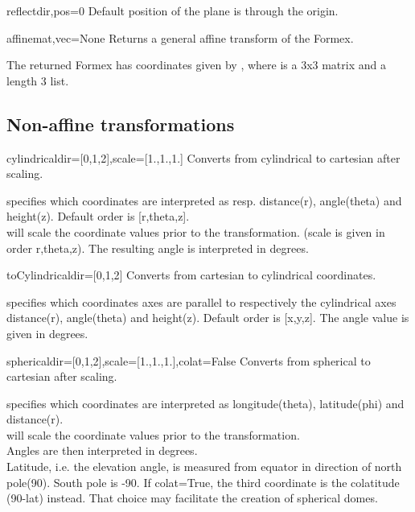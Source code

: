 {{\begin{methoddesc}{reflect}{dir,pos=0}
Default position of the plane is through the origin.
\end{methoddesc}

\begin{methoddesc}{affine}{mat,vec=None}
Returns a general affine transform of the Formex.

The returned Formex has coordinates given by , where  is a 3x3 matrix and  a length 3 list.
\end{methoddesc}


\subsection{Non-affine transformations}

\begin{methoddesc}{cylindrical}{dir=[0,1,2],scale=[1.,1.,1.]}
Converts from cylindrical to cartesian after scaling.

 specifies which coordinates are interpreted as resp. distance(r), angle(theta) and height(z). Default order is [r,theta,z].\\
 will scale the coordinate values prior to the transformation. (scale is given in order r,theta,z). The resulting angle is interpreted in degrees.
\end{methoddesc}


\begin{methoddesc}{toCylindrical}{dir=[0,1,2]}
Converts from cartesian to cylindrical coordinates.

 specifies which coordinates axes are parallel to respectively the cylindrical axes distance(r), angle(theta) and height(z). Default order is [x,y,z]. The angle value is given in degrees.
\end{methoddesc}

\begin{methoddesc}{spherical}{dir=[0,1,2],scale=[1.,1.,1.],colat=False}
Converts from spherical to cartesian after scaling.

 specifies which coordinates are interpreted as longitude(theta), latitude(phi) and distance(r).\\
 will scale the coordinate values prior to the transformation.\\
Angles are then interpreted in degrees.\\
Latitude, i.e. the elevation angle, is measured from equator in
direction of north pole(90). South pole is -90.
If colat=True, the third coordinate is the colatitude (90-lat) instead.
That choice may facilitate the creation of spherical domes.
\end{methoddesc}

}}
